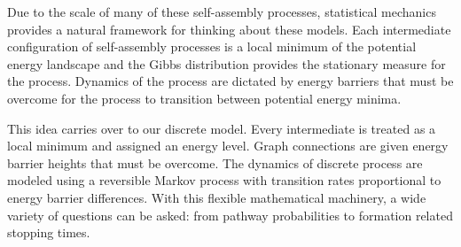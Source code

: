 %
%
%

Due to the scale of many of these self-assembly processes, statistical mechanics provides a natural framework for thinking about these models. Each intermediate configuration of self-assembly processes is a local minimum of the potential energy landscape and the Gibbs distribution provides the stationary measure for the process. Dynamics of the process are dictated by energy barriers that must be overcome for the process to transition between potential energy minima. 

This idea carries over to our discrete model. Every intermediate is treated as a local minimum and assigned an energy level. Graph connections are given energy barrier heights that must be overcome. The dynamics of discrete process are modeled using a reversible Markov process with transition rates proportional to energy barrier differences. With this flexible mathematical machinery, a wide variety of questions can be asked: from pathway probabilities to formation related stopping times.


